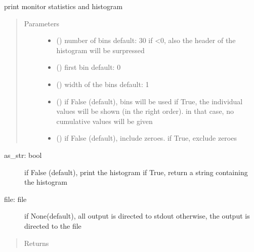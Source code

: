 \documentclass[letterpaper,10pt,english]{sphinxmanual}
\begin{document}
\begin{fulllineitems}
\begin{fulllineitems}
\label{\detokenize{Reference:salabim.Monitor.print_histogram}}
print monitor statistics and histogram
\begin{quote}\begin{description}
\item[{Parameters}] \leavevmode\begin{itemize}
\item {} 
 () \textendash{} number of bins 
default: 30 
if \textless{}0, also the header of the histogram will be surpressed

\item {} 
 () \textendash{} first bin 
default: 0

\item {} 
 () \textendash{} width of the bins 
default: 1

\item {} 
 () \textendash{} if False (default), bins will be used 
if True, the individual values will be shown (in the right order).
in that case, no cumulative values will be given 

\item {} 
 () \textendash{} if False (default), include zeroes. if True, exclude zeroes

\end{itemize}

\end{description}\end{quote}
\begin{description}
\item[{as\_str: bool}] \leavevmode
if False (default), print the histogram
if True, return a string containing the histogram

\item[{file: file}] \leavevmode
if None(default), all output is directed to stdout 
otherwise, the output is directed to the file

\end{description}
\begin{quote}\begin{description}
\item[{Returns}] \leavevmode
{}


\end{description}
\end{quote}
\end{fulllineitems}
\end{fulllineitems}
\end{document}
